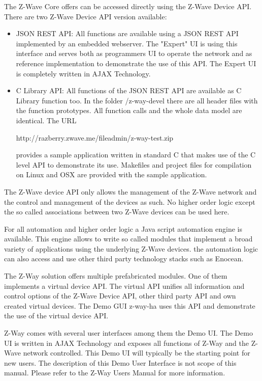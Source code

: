 The Z-Wave Core offers can be accessed directly using the Z-Wave Device API. There are two
Z-Wave Device API version available:
\begin{itemize}
\item JSON REST API: All functions are available using a JSON REST API implemented by an 
embedded webserver. The "Expert" UI is using this interface and serves both as programmers 
UI to operate the network and as reference implementation to demonstrate the use of this 
API. The Expert UI is completely written in AJAX Technology.
\item C Library API: All functions of the JSON REST API are available as C Library 
function too. In the folder /z-way-devel there are all header files with the function 
prototypes. All function calls and the whole data model are identical. The URL

http://razberry.zwave.me/fileadmin/z-way-test.zip
 
provides a sample application written in standard C that makes use of the C level API to 
demonstrate its use. Makefiles and project files for compilation on Linux and OSX are provided
with the sample application.

\end{itemize}

The Z-Wave device API only allows the management of the Z-Wave network and the control
and management of the devices as such. No higher order logic except the so called associations
between two Z-Wave devices can be used here.

For all automation and higher order logic a Java script automation engine is available.
This engine allows to write so called modules that implement a broad variety of applications
using the underlying Z-Wave devices. the automation logic can also access and use other 
third party technology stacks such as Enocean.

The Z-Way solution offers multiple prefabricated modules. One of them implements
a virtual device API. The virtual API unifies all information and control options
of the Z-Wave Device API, other third party API and own created virtual devices.
The Demo GUI z-way-ha uses this API and demonstrate the use of the virtual device API.


 
 
 

Z-Way comes with several user interfaces among them the Demo UI. The Demo UI is written in AJAX Technology 
and exposes all functions of Z-Way and the Z-Wave network controlled. This Demo UI will typically be the 
starting point for new users. The description of this Demo User Interface is not scope of this manual. Please refer to
the Z-Way Users Manual for more information.


